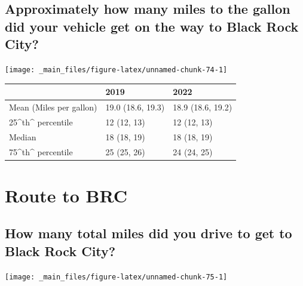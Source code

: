 \documentclass[
]{book}
\begin{document}
\hypertarget{approximately-how-many-miles-to-the-gallon-did-your-vehicle-get-on-the-way-to-black-rock-city}{%
\subsection{Approximately how many miles to the gallon did your vehicle get on the way to Black Rock City?}\label{approximately-how-many-miles-to-the-gallon-did-your-vehicle-get-on-the-way-to-black-rock-city}}

\texttt{[image: \_main\_files/figure-latex/unnamed-chunk-74-1]}

\begin{table}
\centering
\begin{tabular}[t]{>{}l|>{}l|l}
\hline
  & 2019 & 2022\\
\hline
Mean (Miles per gallon) & 19.0 (18.6, 19.3) & 18.9 (18.6, 19.2)\\
\hline
25\textasciicircum{}th\textasciicircum{} percentile & 12 (12, 13) & 12 (12, 13)\\
\hline
Median & 18 (18, 19) & 18 (18, 19)\\
\hline
75\textasciicircum{}th\textasciicircum{} percentile & 25 (25, 26) & 24 (24, 25)\\
\hline
\end{tabular}
\end{table}

\hypertarget{route-to-brc}{%
\section{Route to BRC}\label{route-to-brc}}

\hypertarget{how-many-total-miles-did-you-drive-to-get-to-black-rock-city}{%
\subsection{How many total miles did you drive to get to Black Rock City?}\label{how-many-total-miles-did-you-drive-to-get-to-black-rock-city}}

\texttt{[image: \_main\_files/figure-latex/unnamed-chunk-75-1]}
\end{document}
